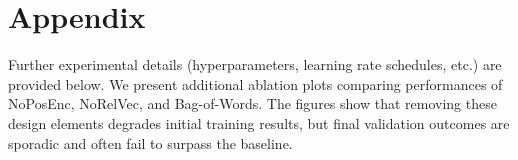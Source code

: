 \documentclass[12pt]{article}
\begin{document}
\appendix
\section*{Appendix}
Further experimental details (hyperparameters, learning rate schedules, etc.) are provided below. We present additional ablation plots comparing performances of NoPosEnc, NoRelVec, and Bag-of-Words. The figures show that removing these design elements degrades initial training results, but final validation outcomes are sporadic and often fail to surpass the baseline.

\medskip


\end{document}

